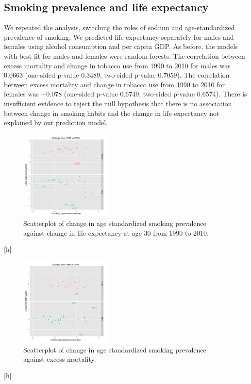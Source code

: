 \documentclass{article}
\begin{document}
\clearpage
\subsection{Smoking prevalence and life expectancy}
We repeated the analysis, switching the roles of sodium and age-standardized prevalence of smoking.  We predicted life expectancy separately for males and females using alcohol consumption and per capita GDP.  As before, the models with best fit for males and females were random forests.  The correlation between excess mortality and change in tobacco use from 1990 to 2010 for males was $0.0663$ (one-sided p-value $0.3489$, two-sided p-value $0.7059$).  The correlation between excess mortality and change in tobacco use from 1990 to 2010 for females was $-0.078$ (one-sided p-value $0.6749$, two-sided p-value $0.6574$).  There is insufficient evidence to reject the null hypothesis that there is no association between change in smoking habits and the change in life expectancy not explained by our prediction model.


\begin{figure}[h]
\centering
\includegraphics[width = 0.4\textwidth]{smoking_lifeexp.pdf}
\caption{Scatterplot of change in age standardized smoking prevalence against change in life expectancy at age 30 from 1990 to 2010.}\label{fig:smoking_lifeexp}
\end{figure}[h]

\begin{figure}[h]
\centering
\includegraphics[width = 0.4\textwidth]{smoking_exmort.pdf}
\caption{Scatterplot of change in age standardized smoking prevalence against excess mortality.}\label{fig:smoking_excessmortality}
\end{figure}[h]
\end{document}
